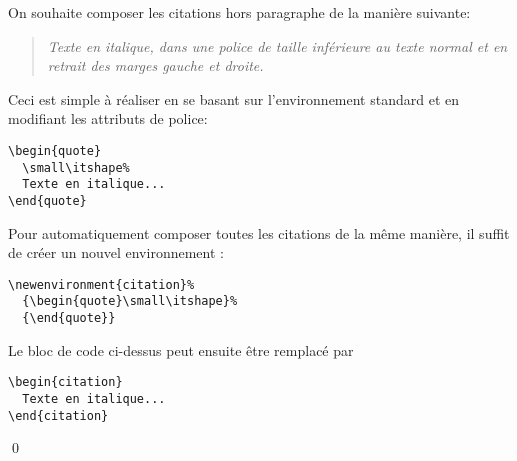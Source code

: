 \begin{exemple}
  \label{ex:commandes:citation}
  On souhaite composer les citations hors paragraphe de la
  manière suivante:
  \begin{quote}
    \small\itshape%
    Texte en italique, dans une police de taille inférieure au texte
    normal et en retrait des marges gauche et droite.
  \end{quote}
  Ceci est simple à réaliser en se basant sur l'environnement standard
   et en modifiant les attributs de police:
\begin{lstlisting}
\begin{quote}
  \small\itshape%
  Texte en italique...
\end{quote}
\end{lstlisting}

  Pour automatiquement composer toutes les citations de la même
  manière, il suffit de créer un nouvel environnement :
\begin{lstlisting}
\newenvironment{citation}%
  {\begin{quote}\small\itshape}%
  {\end{quote}}
\end{lstlisting}
  Le bloc de code ci-dessus peut ensuite être remplacé par
\begin{lstlisting}
\begin{citation}
  Texte en italique...
\end{citation}
\end{lstlisting}
  \qed
\end{exemple}

